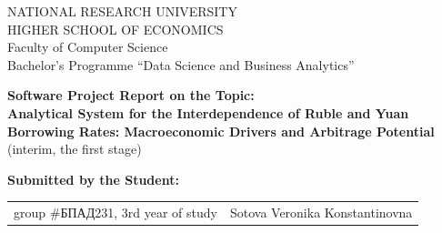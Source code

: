 \begin{titlepage}
\newpage

{
\begin{center}
NATIONAL RESEARCH UNIVERSITY\\
HIGHER SCHOOL OF ECONOMICS
\\
\bigskip
Faculty of Computer Science\\
Bachelor’s Programme “Data Science and Business Analytics”
\end{center}
}

\vspace{2em}

\vspace{4em}

\begin{center}
{\bf Software Project Report on the Topic:}\\
{\bf Analytical System for the Interdependence of Ruble and Yuan Borrowing Rates: Macroeconomic Drivers and Arbitrage Potential}\\
(interim, the first stage)
\end{center}

\vspace{2em}

{\bf Submitted by the Student: \vspace{2mm}}

{
\begin{tabular}{l@{\hskip 1.5cm}l}
group \#\foreignlanguage{russian}{БПАД}231, 3rd year of study & 
Sotova Veronika Konstantinovna \\
\end{tabular}}



\end{titlepage}
